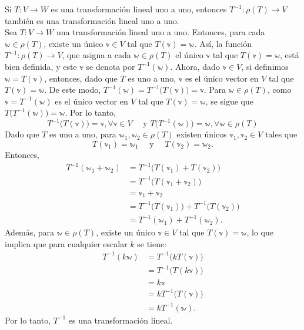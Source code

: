 \begin{theorem}
    Si $T: V \longrightarrow W$ es una transformación lineal uno a uno, entonces $T^{-1}: \rho(T) \longrightarrow V$ también es una transformación lineal uno a uno. \\
    \demostracion Sea $T: V \longrightarrow W$ una transformación lineal uno a uno. Entonces, para cada $\mathbb{w} \in \rho(T)$, existe un único $\mathbb{v} \in V$ tal que $T(\mathbb{v}) = \mathbb{w}$. Así, la función $T^{-1}: \rho(T) \longrightarrow V$, que asigna a cada $\mathbb{w} \in \rho(T)$ el único $\mathbb{v}$ tal que $T(\mathbb{v}) = \mathbb{w}$, está bien definida, y este $\mathbb{v}$ se denota por $T^{-1}(\mathbb{w})$. Ahora, dado $\mathbb{v} \in V$, si definimos $\mathbb{w} = T(\mathbb{v})$, entonces, dado que $T$ es uno a uno, $\mathbb{v}$ es el único vector en $V$ tal que $T(\mathbb{v}) = \mathbb{w}$. De este modo, $T^{-1}(\mathbb{w}) = T^{-1}\big(T(\mathbb{v})\big) = \mathbb{v}$. Para $\mathbb{w} \in \rho(T)$, como $\mathbb{v} = T^{-1}(\mathbb{w})$ es el único vector en $V$ tal que $T(\mathbb{v}) = \mathbb{w}$, se sigue que $T\big(T^{-1}(\mathbb{w})\big) = \mathbb{w}$. Por lo tanto,
    $$T^{-1}\big(T(\mathbb{v})\big) = \mathbb{v}, \forall \mathbb{v} \in V \quad \text{ y } T\big(T^{-1}(\mathbb{w})\big) = \mathbb{w}, \forall \mathbb{w} \in \rho(T)$$
    Dado que $T$ es uno a uno, para $\mathbb{w}_1, \mathbb{w}_2 \in \rho(T)$ existen únicos $\mathbb{v}_1, \mathbb{v}_2 \in V$ tales que
    $$T(\mathbb{v}_1) = \mathbb{w}_1 \quad \text{ y } \quad T(\mathbb{v}_2) = \mathbb{w}_2.$$
    Entonces,
    \begin{align*}
        T^{-1}(\mathbb{w}_1 + \mathbb{w}_2) & = T^{-1}\big(T(\mathbb{v}_1) + T(\mathbb{v}_2)\big) \\
        & = T^{-1}\big(T(\mathbb{v}_1 + \mathbb{v}_2)\big) \\
        & = \mathbb{v}_1 + \mathbb{v}_2 \\
        & = T^{-1}\big(T(\mathbb{v}_1)\big) + T^{-1}\big(T(\mathbb{v}_2)\big) \\
        & = T^{-1}(\mathbb{w}_1) + T^{-1}(\mathbb{w}_2).
    \end{align*}
    Además, para $\mathbb{w} \in \rho(T)$, existe un único $\mathbb{v} \in V$ tal que $T(\mathbb{v}) = \mathbb{w}$, lo que implica que para cualquier escalar $k$ se tiene:
    \begin{align*}
        T^{-1}(k\mathbb{w}) & = T^{-1}\big(kT(\mathbb{v})\big) \\
        & = T^{-1}\big(T(k\mathbb{v})\big) \\
        & = k\mathbb{v} \\
        & = kT^{-1}\big(T(\mathbb{v})\big) \\
        & = kT^{-1}(\mathbb{w}).
    \end{align*}
    Por lo tanto, $T^{-1}$ es una transformación lineal. 


\end{theorem}

